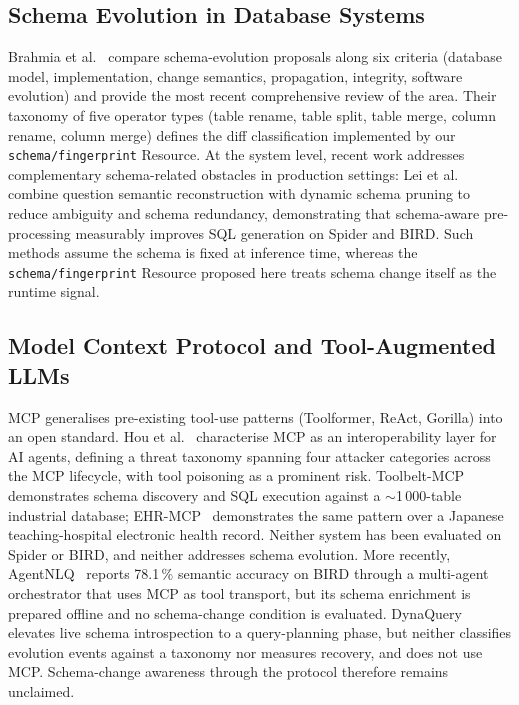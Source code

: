 \documentclass[conference,10pt,a4paper]{IEEEtran}
\begin{document}
\subsection{Schema Evolution in Database Systems}
Brahmia et al.~\cite{brahmia2024schemaevol} compare schema-evolution
proposals along six criteria (database model, implementation, change
semantics, propagation, integrity, software evolution) and provide the
most recent comprehensive review of the area. Their taxonomy of five operator types
(table rename, table split, table merge, column rename, column merge)
defines the diff classification implemented by our
\texttt{schema/fingerprint} Resource.
At the system level, recent work addresses complementary
schema-related obstacles in production settings: Lei et
al.~\cite{lei2026srspsql} combine question semantic reconstruction with
dynamic schema pruning to reduce ambiguity and schema redundancy,
demonstrating that schema-aware pre-processing measurably improves SQL
generation on Spider and BIRD.
Such methods assume the schema is fixed at inference time, whereas the
\texttt{schema/fingerprint} Resource proposed here treats schema change
itself as the runtime signal.

\subsection{Model Context Protocol and Tool-Augmented LLMs}
MCP generalises pre-existing tool-use patterns
(Toolformer, ReAct, Gorilla) into an open
standard. Hou et al.~\cite{hou2025mcp} characterise MCP as an
interoperability layer for AI agents, defining a threat taxonomy
spanning four attacker categories across the MCP lifecycle,
with tool poisoning as a prominent risk. Toolbelt-MCP~\cite{agater2026toolbelt} demonstrates
schema discovery and SQL execution against a $\sim$1\,000-table industrial
database; EHR-MCP~\cite{masayoshi2025ehrmcp} demonstrates the same pattern
over a Japanese teaching-hospital electronic health record. Neither system
has been evaluated on Spider or BIRD, and neither addresses schema evolution.
More recently, AgentNLQ~\cite{bogdanov2026agentnlq} reports 78.1\,\%
semantic accuracy on BIRD through a multi-agent orchestrator that uses MCP
as tool transport, but its schema enrichment is prepared offline and no
schema-change condition is evaluated. DynaQuery~\cite{hassini2025dynaquery}
elevates live schema introspection to a query-planning phase, but neither
classifies evolution events against a taxonomy nor measures recovery, and
does not use MCP. Schema-change awareness through the protocol therefore
remains unclaimed.
\end{document}
